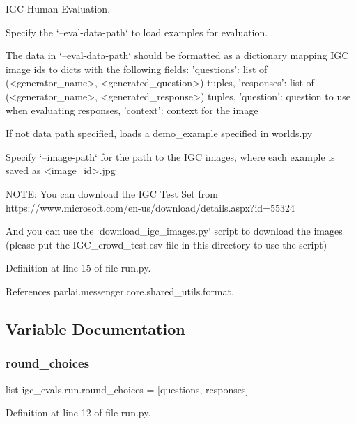 \begin{DoxyVerb}    IGC Human Evaluation.

    Specify the `--eval-data-path` to load examples for evaluation.

    The data in `--eval-data-path` should be formatted as a dictionary
    mapping IGC image ids to dicts with the following fields:
    {
        'questions': list of (<generator_name>, <generated_question>) tuples,
        'responses': list of (<generator_name>, <generated_response>) tuples,
        'question': question to use when evaluating responses,
        'context': context for the image
    }

    If not data path specified, loads a demo_example specified in worlds.py

    Specify `--image-path` for the path to the IGC images, where each example
    is saved as <image_id>.jpg


    NOTE: You can download the IGC Test Set from
        https://www.microsoft.com/en-us/download/details.aspx?id=55324

    And you can use the `download_igc_images.py` script to download the images
    (please put the IGC_crowd_test.csv file in this directory to use the script)\end{DoxyVerb}
 

Definition at line 15 of file run.\+py.



References parlai.\+messenger.\+core.\+shared\+\_\+utils.\+format.



\subsection{Variable Documentation}
\mbox{\label{namespaceigc__evals_1_1run_ae97b39ec3dea2c6577e9207f48f2e969}} 
\subsubsection{\texorpdfstring{round\+\_\+choices}{round\_choices}}
{\footnotesize\ttfamily list igc\+\_\+evals.\+run.\+round\+\_\+choices = \mbox{[}\textquotesingle{}questions\textquotesingle{}, \textquotesingle{}responses\textquotesingle{}\mbox{]}}



Definition at line 12 of file run.\+py.


